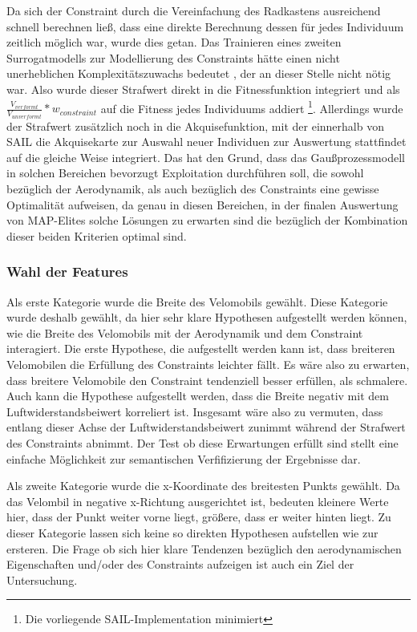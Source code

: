 Da sich der Constraint durch die Vereinfachung des Radkastens ausreichend schnell berechnen ließ, dass eine direkte Berechnung dessen für jedes Individuum zeitlich möglich war, wurde dies getan.
Das Trainieren eines zweiten Surrogatmodells zur Modellierung des Constraints hätte einen nicht unerheblichen Komplexitätszuwachs bedeutet , der an dieser Stelle nicht nötig war.
Also wurde dieser Strafwert direkt in die Fitnessfunktion integriert und als $\frac{V_{verformt}}{V_{unverformt}} * w_{constraint}$ auf die Fitness jedes Individuums addiert
\footnote{Die vorliegende SAIL-Implementation minimiert}.
Allerdings wurde der Strafwert zusätzlich noch in die Akquisefunktion, mit der einnerhalb von SAIL die Akquisekarte zur Auswahl neuer Individuen zur Auswertung stattfindet auf die gleiche Weise integriert. Das hat den Grund, dass das Gaußprozessmodell in solchen Bereichen bevorzugt Exploitation durchführen soll, die sowohl bezüglich der Aerodynamik, als auch bezüglich des Constraints eine gewisse Optimalität aufweisen, da genau in diesen Bereichen, in der finalen Auswertung von MAP-Elites solche Lösungen zu erwarten sind die bezüglich der Kombination dieser beiden Kriterien optimal sind.


\subsubsection{Wahl der Features}

Als erste Kategorie wurde die Breite des Velomobils gewählt.
Diese Kategorie wurde deshalb gewählt, da hier sehr klare Hypothesen aufgestellt werden können, wie die Breite des Velomobils mit der Aerodynamik und dem Constraint interagiert.
Die erste Hypothese, die aufgestellt werden kann ist, dass breiteren Velomobilen die Erfüllung des Constraints leichter fällt. Es wäre also zu erwarten, dass breitere Velomobile den Constraint tendenziell besser erfüllen, als schmalere.
Auch kann die Hypothese aufgestellt werden, dass die Breite negativ mit dem Luftwiderstandsbeiwert korreliert ist.
Insgesamt wäre also zu vermuten, dass entlang dieser Achse der Luftwiderstandsbeiwert zunimmt während der Strafwert des Constraints abnimmt.
Der Test ob diese Erwartungen erfüllt sind stellt eine einfache Möglichkeit zur semantischen Verfifizierung der Ergebnisse dar.

Als zweite Kategorie wurde die x-Koordinate des breitesten Punkts gewählt.
Da das Velombil in negative x-Richtung ausgerichtet ist, bedeuten kleinere Werte hier, dass der Punkt weiter vorne liegt, größere, dass er weiter hinten liegt.
Zu dieser Kategorie lassen sich keine so direkten Hypothesen aufstellen wie zur ersteren.
Die Frage ob sich hier klare Tendenzen bezüglich den aerodynamischen Eigenschaften und/oder des Constraints aufzeigen ist auch ein Ziel der Untersuchung.

